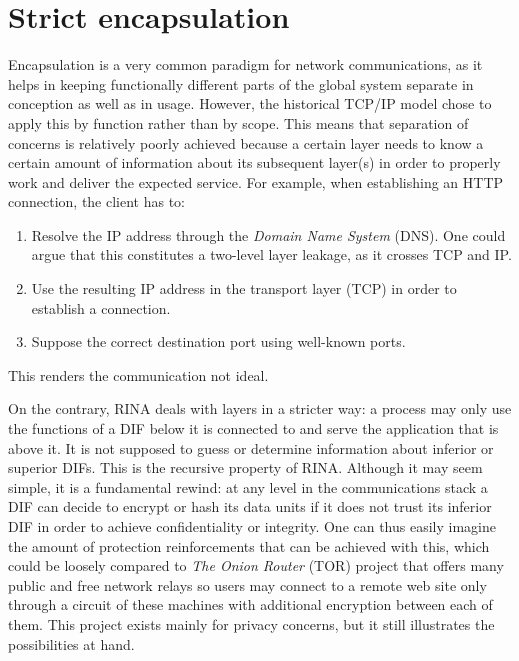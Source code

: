 \documentclass[a4paper]{proc}
\begin{document}
\section{Strict encapsulation}

\par Encapsulation is a very common paradigm for network communications, as it
helps in keeping functionally different parts of the global system separate in
conception as well as in usage. However, the historical TCP/IP model chose to
apply this by function rather than by scope. This means that separation of
concerns is relatively poorly achieved because a certain layer needs to know a
certain amount of information about its subsequent layer(s) in order to properly
work and deliver the expected service. For example, when establishing an HTTP
connection, the client has to:
\begin{enumerate}
    \item Resolve the IP address through the \textit{Domain Name System} (DNS).
        One could argue that this constitutes a two-level layer leakage, as it
        crosses TCP and IP.
    \item Use the resulting IP address in the transport layer (TCP) in order to
        establish a connection.
    \item Suppose the correct destination port using well-known ports.
\end{enumerate}
This renders the communication not ideal.

\par On the contrary, RINA deals with layers in a stricter way: a process may
only use the functions of a DIF below it is connected to and serve the
application that is above it. It is not supposed to guess or determine
information about inferior or superior DIFs. This is the recursive property of
RINA. Although it may seem simple, it is a fundamental rewind: at any level in
the communications stack a DIF can decide to encrypt or hash its data units if
it does not trust its inferior DIF in order to achieve confidentiality or
integrity. One can thus easily imagine the amount of protection reinforcements
that can be achieved with this, which could be loosely compared to \textit{The
Onion Router} (TOR) project that offers many public and free network relays so
users may connect to a remote web site only through a circuit of these machines
with additional encryption between each of them. This project exists mainly for
privacy concerns, but it still illustrates the possibilities at hand.
\end{document}
